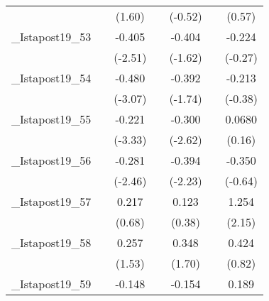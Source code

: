 {\begin{tabular}{l*{6}{c}}
            &                     &      (1.60)         &                     &     (-0.52)         &                     &      (0.57)         \\
[1em]
\_Istapost19\_53&                     &      -0.405\sym{*}  &                     &      -0.404         &                     &      -0.224         \\
            &                     &     (-2.51)         &                     &     (-1.62)         &                     &     (-0.27)         \\
[1em]
\_Istapost19\_54&                     &      -0.480\sym{**} &                     &      -0.392         &                     &      -0.213         \\
            &                     &     (-3.07)         &                     &     (-1.74)         &                     &     (-0.38)         \\
[1em]
\_Istapost19\_55&                     &      -0.221\sym{**} &                     &      -0.300\sym{*}  &                     &      0.0680         \\
            &                     &     (-3.33)         &                     &     (-2.62)         &                     &      (0.16)         \\
[1em]
\_Istapost19\_56&                     &      -0.281\sym{*}  &                     &      -0.394\sym{*}  &                     &      -0.350         \\
            &                     &     (-2.46)         &                     &     (-2.23)         &                     &     (-0.64)         \\
[1em]
\_Istapost19\_57&                     &       0.217         &                     &       0.123         &                     &       1.254\sym{*}  \\
            &                     &      (0.68)         &                     &      (0.38)         &                     &      (2.15)         \\
[1em]
\_Istapost19\_58&                     &       0.257         &                     &       0.348         &                     &       0.424         \\
            &                     &      (1.53)         &                     &      (1.70)         &                     &      (0.82)         \\
[1em]
\_Istapost19\_59&                     &      -0.148\sym{*}  &                     &      -0.154         &                     &       0.189         \\

\end{tabular}}
